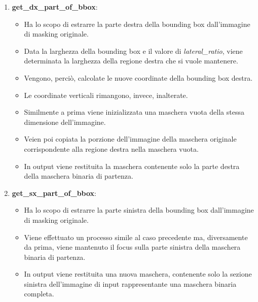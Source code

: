 \documentclass[12pt,a4paper,openright,twoside]{book}
\begin{document}
\begin{enumerate}
\begin{figure}[H]
	\centering
    	
\end{figure} 

\item \textbf{get\_dx\_part\_of\_bbox}:
\begin{itemize}
\item Ha lo scopo di estrarre la parte destra della bounding box dall'immagine di masking originale.
\item Data la larghezza della bounding box e il valore di {\itshape lateral\_ratio}, viene determinata la larghezza della regione destra che si vuole mantenere.
\item Vengono, perciò, calcolate le nuove coordinate della bounding box destra.
\item Le coordinate verticali rimangono, invece, inalterate.
\item Similmente a prima viene inizializzata una maschera vuota della stessa dimensione dell'immagine.
\item Veien poi copiata la porzione dell'immagine della maschera originale corrispondente alla regione destra nella maschera vuota.
\item In output viene restituita la maschera contenente solo la parte destra della maschera binaria di partenza.
\end{itemize}

\item \textbf{get\_sx\_part\_of\_bbox}:
\begin{itemize}
\item Ha lo scopo di estrarre la parte sinistra della bounding box dall'immagine di masking originale.
\item Viene effettuato un processo simile al caso precedente ma, diversamente da prima, viene mantenuto il focus sulla parte sinistra della maschera binaria di partenza.
\item In output viene restituita una nuova maschera, contenente solo la sezione sinistra dell'immagine di input rappresentante una maschera binaria completa.
\end{itemize}
\end{enumerate}
\end{document}

